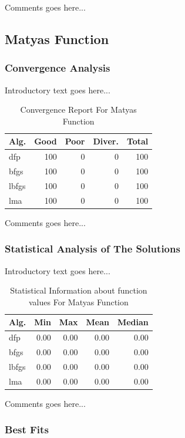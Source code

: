 \documentclass{ieeeaccess}
\begin{document}
Comments goes here...
\subsection{Matyas Function}
\label{matyas2D}

\subsubsection{Convergence Analysis}
\label{convergencematyas2D}


Introductory text goes here...
\begin{table}
\centering
\caption{Convergence Report For Matyas Function}
\label{convergence:matyas}
\begin{tabular}{lrrrr}
\toprule
 Alg. &  Good &  Poor &  Diver. &  Total \\
\midrule
  dfp &   100 &     0 &       0 &    100 \\
 bfgs &   100 &     0 &       0 &    100 \\
lbfgs &   100 &     0 &       0 &    100 \\
  lma &   100 &     0 &       0 &    100 \\
\bottomrule
\end{tabular}
\end{table}


Comments goes here...
\subsubsection{Statistical Analysis of The Solutions}
\label{statisticalanalysismatyas2D}


Introductory text goes here...
\begin{table}
\centering
\caption{Statistical Information about function values For Matyas Function}
\label{function_values:matyas}
\begin{tabular}{lrrrr}
\toprule
 Alg. &  Min &  Max &  Mean &  Median \\
\midrule
  dfp & 0.00 & 0.00 &  0.00 &    0.00 \\
 bfgs & 0.00 & 0.00 &  0.00 &    0.00 \\
lbfgs & 0.00 & 0.00 &  0.00 &    0.00 \\
  lma & 0.00 & 0.00 &  0.00 &    0.00 \\
\bottomrule
\end{tabular}
\end{table}


Comments goes here...
\subsubsection{Best Fits}
\label{bestfitsmatyas2D}
\end{document}
